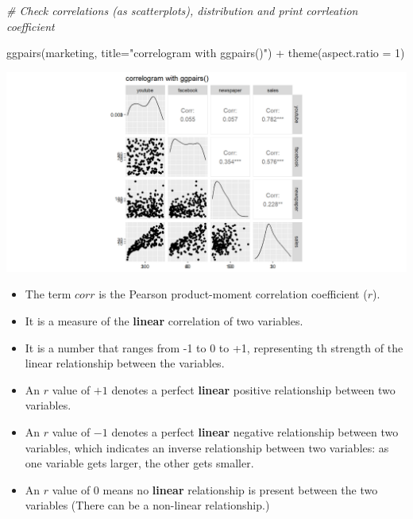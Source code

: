 \documentclass[
]{book}
\newenvironment{Shaded}{\begin{snugshade}}{\end{snugshade}}
\newcommand{\AttributeTok}[1]{\textcolor[rgb]{0.77,0.63,0.00}{#1}}
\newcommand{\CommentTok}[1]{\textcolor[rgb]{0.56,0.35,0.01}{\textit{#1}}}
\newcommand{\DecValTok}[1]{\textcolor[rgb]{0.00,0.00,0.81}{#1}}
\newcommand{\FunctionTok}[1]{\textcolor[rgb]{0.00,0.00,0.00}{#1}}
\newcommand{\NormalTok}[1]{#1}
\newcommand{\SpecialCharTok}[1]{\textcolor[rgb]{0.00,0.00,0.00}{#1}}
\newcommand{\StringTok}[1]{\textcolor[rgb]{0.31,0.60,0.02}{#1}}
\providecommand{\tightlist}{%
  \setlength{\itemsep}{0pt}\setlength{\parskip}{0pt}}
\begin{document}
\begin{Shaded}
\begin{Highlighting}[]
\CommentTok{\# Check correlations (as scatterplots), distribution and print corrleation coefficient }

\FunctionTok{ggpairs}\NormalTok{(marketing, }\AttributeTok{title=}\StringTok{"correlogram with ggpairs()"}\NormalTok{) }\SpecialCharTok{+}
   \FunctionTok{theme}\NormalTok{(}\AttributeTok{aspect.ratio =} \DecValTok{1}\NormalTok{)}
\end{Highlighting}
\end{Shaded}

\begin{center}\includegraphics{figure/unnamed-chunk-27-1} \end{center}

\begin{itemize}
\tightlist
\item
  The term \(corr\) is the Pearson product-moment correlation coefficient (\(r\)).
\item
  It is a measure of the \textbf{linear} correlation of two variables.
\item
  It is a number that ranges from -1 to 0 to +1, representing th strength of the linear relationship between the variables.
\item
  An \(r\) value of \(+1\) denotes a perfect \textbf{linear} positive relationship between two variables.
\item
  An \(r\) value of \(-1\) denotes a perfect \textbf{linear} negative relationship between two variables, which indicates an inverse relationship between two variables: as one variable gets larger, the other gets smaller.
\item
  An \(r\) value of 0 means no \textbf{linear} relationship is present between the two variables (There can be a non-linear relationship.)
\end{itemize}
\end{document}
